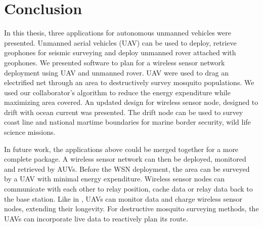 
\chapter[Conclusion]{Conclusion}
\label{chap-conc}

In this thesis, three applications for autonomous unmanned vehicles were presented.
Unmanned aerial vehicles (UAV) can be used to deploy, retrieve geophones for seismic surveying and deploy unmanned rover attached with geophones.
We presented software to plan for a wireless sensor network deployment using UAV and unmanned rover.
UAV were used to drag an electrified net through an area to destructively survey mosquito populations.
We used our collaborator's algorithm to reduce the energy expenditure while maximizing area covered.
An updated design for wireless sensor node, designed to drift with ocean current was presented.
The drift node can be used to survey coast line and national martime boundaries for marine border security, wild life science missions.

In future work, the applications above could be merged together for a more complete package.
A wireless sensor network can then be deployed, monitored and retrieved by AUVs.
Before the WSN deployment, the area can be surveyed by a UAV with minimal energy expenditure.
Wireless sensor nodes can communicate with each other to relay position, cache data or relay data back to the base station.
Like in \cite{sudarshanwsn}, UAVs can monitor data and charge wireless sensor nodes, extending their longevity.
For destructive mosquito surveying methods, the UAVs can incorporate live data to reactively plan its route.

